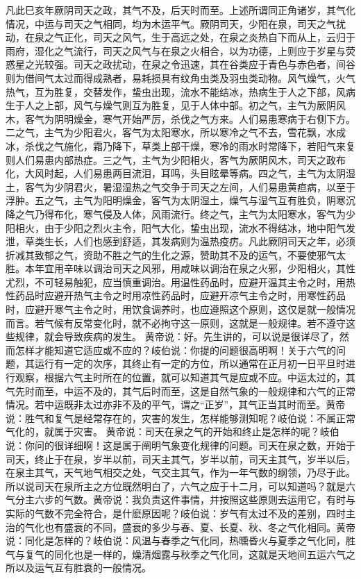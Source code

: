 \documentclass[a4paper,12pt,UTF8,twoside]{ctexbook}
\begin{document}
凡此巳亥年厥阴司天之政，其气不及，后天时而至。上述所谓同正角诸岁，其气化情况，中运与司天之气相同，均为木运平气。厥阴司天，少阳在泉，司天之气扰动，在泉之气正化，司天之风气，生于高远之处，在泉之炎热自下而从上，云归于雨府，湿化之气流行，司天之风气与在泉之火相合，以为功德，上则应于岁星与荧惑星之光较强。司天之政扰动，在泉之令迅速，其在谷类应于青色与赤色者，间谷则为借间气太过而得成熟者，易耗损具有纹角虫类及羽虫类动物。风气燥气，火气热气，互为胜复，交替发作，蛰虫出现，流水不能结冰，热病生于人之下部，风病生于人之上部，风气与燥气则互为胜复，见于人体中部。初之气，主气为厥阴风木，客气为阴明燥金，寒气开始严厉，杀伐之气方来。人们易患寒病于右侧下方。二之气，主气为少阳君火，客气为太阳寒水，所以寒冷之气不去，雪花飘，水成冰，杀伐之气施化，霜乃降下，草类上部干燥，寒冷的雨水时常降下，若阳气来复则人们易患内部热症。三之气，主气为少阳相火，客气为厥阴风木，司天之政布化，大风时起，人们易患两目流泪，耳鸣，头目眩晕等病。四之气，主气为太阴湿土，客气为少阴君火，暑湿湿热之气交争于司天之左间，人们易患黄疸病，以至于浮肿。五之气，主气为阳明燥金，客气为太阴湿土，燥气与湿气互有胜负，阴寒沉降之气乃得布化，寒气侵及人体，风雨流行。终之气，主气为太阳寒水，客气为少阳相火，由于少阳之烈火主令，阳气大化，蛰虫出现，流水不得结冰，地中阳气发泄，草类生长，人们也感到舒适，其发病则为温热疫疠。凡此厥阴司天之年，必须折减其致郁之气，资助不胜之气的生化之源，赞助其不及的运气，不要使邪气太胜。本年宜用辛味以调治司天之风邪，用咸味以调治在泉之火邪，少阳相火，其性尤烈，不可轻易触犯，应当慎重调治。用温性药品时，应避开温其主令之时，用热性药品时应避开热气主令之时用凉性药品时，应避开凉气主令之时，用寒性药品时，应避开寒气主令之时，用饮食调养时，也应遵照这个原则，这仅是就一般情况而言。若气候有反常变化时，就不必拘守这一原则，这就是一般规律。若不遵守这些规律，就会导致疾病的发生。
黄帝说：好。先生讲的，可以说是很详尽了，然而怎样才能知道它适应或不应的？岐伯说：你提的问题很高明啊！关于六气的问题，其运行有一定的次序，其终止有一定的方位，所以通常在正月初一日平旦时进行观察，根据六气主时所在的位置，就可以知道其气是应或不应。中运太过的，其气先时而至，中运不及的，其气后时而至，这是自然气象的一般规律和六气的正常情况。若中运既非太过亦非不及的平气，谓之“正岁”，其气正当其时而至。黄帝说：胜气和复气是经常存在的，灾害的发生，怎样能够测知呢？岐伯说：不属正常气化的，就属于灾害。
黄帝说：司天在泉之气的开始和终止是怎样的呢？岐伯说：你问的很详细啊！这是属于阐明气象变化规律的问题。司天在泉之数，开始于司天，终止于在泉，岁半以前，司天主其气，岁半以前，司天主其气，岁半以后，在泉主其气，天气地气相交之处，气交主其气，作为一年气数的纲领，乃尽于此。所以说司天在泉所主之方位既然明白了，六气之应于十二月，可以知道吗？就是六气分主六步的气数。黄帝说：我负责这件事情，并按照这些原则去运用它，有时与实际的气数不完全符合，是什麽原因呢？岐伯说：岁气有太过不及的差别，四时主治的气化也有盛衰的不同，盛衰的多少与春、夏、长夏、秋、冬之气化相同。黄帝说：同化是怎样的？岐伯说：风温与春季之气化同，热曛昏火与夏季之气化同，胜气与复气的同化也是一样的，燥清烟露与秋季之气化同，这就是天地间五运六气之所以及运气互有胜衰的一般情况。
\end{document}
